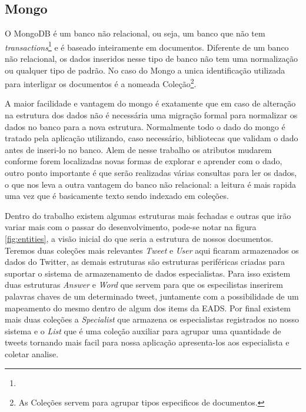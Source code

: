 \subsection{Mongo}
O MongoDB é um banco não relacional, ou seja, um banco que não tem \textit{transactions}\footnote{} e é baseado inteiramente em documentos. Diferente de um banco não relacional, os dados inseridos nesse tipo de banco não tem uma normalização ou qualquer tipo de padrão. No caso do Mongo a unica identificação utilizada para interligar os documentos é a nomeada Coleção\footnote{As Coleções servem para agrupar tipos especificos de documentos.}.

A maior facilidade e vantagem do mongo é exatamente que em caso de alteração na estrutura dos dados não é necessária uma migração formal para normalizar os dados no banco para a nova estrutura. Normalmente todo o dado do mongo é tratado pela aplicação utilizando, caso necessário, bibliotecas que validam o dado antes de inseri-lo no banco. Alem de nesse trabalho os atributos mudarem conforme forem localizadas novas formas de explorar e aprender com o dado, outro ponto importante é que serão realizadas várias consultas para ler os dados, o que nos leva a outra vantagem do banco não relacional: a leitura é mais rapida uma vez que é basicamente texto sendo indexado em coleções.

Dentro do trabalho existem algumas estruturas mais fechadas e outras que irão variar mais com o passar do desenvolvimento, pode-se notar na figura \ref{fig:entities}, a visão inicial do que seria a estrutura de nossos documentos. Teremos duas coleções mais relevantes \textit{Tweet} e \textit{User} aqui ficaram armazenados os dados do Twitter, as demais estruturas são estruturas periféricas criadas para suportar o sistema de armazenamento de dados especialistas. Para isso existem duas estruturas \textit{Answer} e \textit{Word} que servem para que os especilistas inserirem palavras chaves de um determinado tweet, juntamente com a possibilidade de um mapeamento do mesmo dentro de algum dos items da EADS. Por final existem mais duas coleções a \textit{Specialist} que armazena os especialistas registrados no nosso sistema e o \textit{List} que é uma coleção auxiliar para agrupar uma quantidade de tweets tornando mais facil para nossa aplicação apresenta-los aos especialista e coletar analise.

